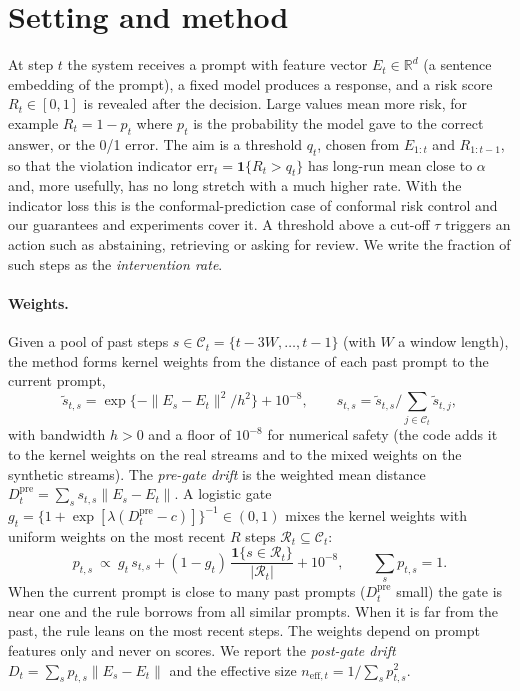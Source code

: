 \section{Setting and method}\label{sec:method}

At step $t$ the system receives a prompt with feature vector $E_t\in\mathbb R^d$ (a sentence embedding of the prompt), a fixed model produces a response, and a risk score $R_t\in[0,1]$ is revealed after the decision. Large values mean more risk, for example $R_t=1-p_t$ where $p_t$ is the probability the model gave to the correct answer, or the 0/1 error. The aim is a threshold $q_t$, chosen from $E_{1:t}$ and $R_{1:t-1}$, so that the violation indicator $\mathrm{err}_t=\mathbf 1\{R_t>q_t\}$ has long-run mean close to $\alpha$ and, more usefully, has no long stretch with a much higher rate. With the indicator loss this is the conformal-prediction case of conformal risk control \citep{angelopoulos2024conformal} and our guarantees and experiments cover it. A threshold above a cut-off $\tau$ triggers an action such as abstaining, retrieving or asking for review. We write the fraction of such steps as the \emph{intervention rate}.

\paragraph{Weights.}
Given a pool of past steps $s\in\mathcal C_t=\{t-3W,\dots,t-1\}$ (with $W$ a window length), the method forms kernel weights from the distance of each past prompt to the current prompt,
\[
 \tilde s_{t,s}=\exp\{-\|E_s-E_t\|^2/h^2\}+10^{-8},\qquad s_{t,s}=\tilde s_{t,s}\Big/\textstyle\sum_{j\in\mathcal C_t}\tilde s_{t,j},
\]
with bandwidth $h>0$ and a floor of $10^{-8}$ for numerical safety (the code adds it to the kernel weights on the real streams and to the mixed weights on the synthetic streams). The \emph{pre-gate drift} is the weighted mean distance
$D^{\mathrm{pre}}_t=\sum_s s_{t,s}\|E_s-E_t\|$. A logistic gate $g_t=\{1+\exp[\lambda(D^{\mathrm{pre}}_t-c)]\}^{-1}\in(0,1)$ mixes the kernel weights with uniform weights on the most recent $R$ steps $\mathcal R_t\subseteq\mathcal C_t$:
\[
 p_{t,s}\ \propto\ g_t\,s_{t,s}+(1-g_t)\,\frac{\mathbf 1\{s\in\mathcal R_t\}}{|\mathcal R_t|}+10^{-8},\qquad \textstyle\sum_s p_{t,s}=1.
\]
When the current prompt is close to many past prompts ($D^{\mathrm{pre}}_t$ small) the gate is near one and the rule borrows from all similar prompts. When it is far from the past, the rule leans on the most recent steps. The weights depend on prompt features only and never on scores. We report the \emph{post-gate drift} $D_t=\sum_s p_{t,s}\|E_s-E_t\|$ and the effective size $n_{\mathrm{eff},t}=1/\sum_s p_{t,s}^2$.

